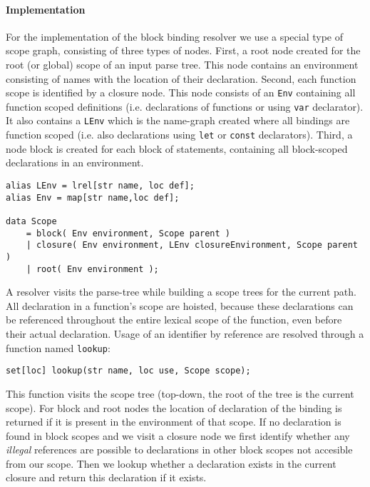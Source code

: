 \paragraph{Implementation}
For the implementation of the block binding resolver we use a special type of scope graph, consisting of three types of nodes. First, a root node created for the root (or global) scope of an input parse tree. This node contains an environment consisting of names with the location of their declaration. Second, each function scope is identified by a closure node. This node consists of an \lstinline$Env$ containing all function scoped definitions (i.e. declarations of functions or using \lstinline$var$ declarator). It also contains a \lstinline$LEnv$ which is the name-graph created where all bindings are function scoped (i.e. also declarations using \lstinline$let$ or \lstinline$const$ declarators). Third, a node block is created for each block of statements, containing all block-scoped declarations in an environment.

\begin{lstlisting}[caption=Data structure for scope graph,language=rascal]
alias LEnv = lrel[str name, loc def];
alias Env = map[str name,loc def];

data Scope 
	= block( Env environment, Scope parent )
	| closure( Env environment, LEnv closureEnvironment, Scope parent )
	| root( Env environment );
\end{lstlisting}

A resolver visits the parse-tree while building a scope trees for the current path. All declaration in a function's scope are hoisted, because these declarations can be referenced throughout the entire lexical scope of the function, even before their actual declaration. Usage of an identifier by reference are resolved through a function named \lstinline$lookup$:

\begin{lstlisting}[language=rascal]
set[loc] lookup(str name, loc use, Scope scope);
\end{lstlisting}

This function visits the scope tree (top-down, the root of the tree is the current scope). For block and root nodes the location of declaration of the binding is returned if it is present in the environment of that scope. If no declaration is found in block scopes and we visit a closure node we first identify whether any \textit{illegal} references are possible to declarations in other block scopes not accesible from our scope. Then we lookup whether a declaration exists in the current closure and return this declaration if it exists.

